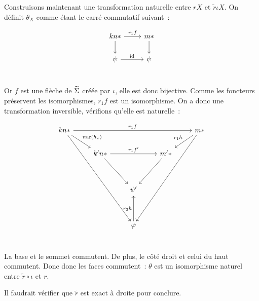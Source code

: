 \begin{pv}
    Construisons maintenant une transformation naturelle entre $rX$ et
    $\tilde{r}\iota X$. On définit $\theta_X$ comme étant le carré commutatif
    suivant~:

    \[\begin{tikzcd}
        kn\ast\arrow[r, "r_1f"]\arrow[d] & m\ast\arrow[d] \\
        \psi\arrow[r, "\id"] & \psi \\
    \end{tikzcd}\]

    Or $f$ est une flèche de $\widetilde{\Sigma}$ créée par $\iota$, elle est donc bijective. Comme
    les foncteurs préservent les isomorphismes, $r_1f$ est un isomorphisme. On a donc
    une transformation inversible, vérifions qu'elle est naturelle~:

    \[\begin{tikzcd}
        kn\ast\arrow[rrrr, "r_1f"]\arrow[dr, "n\arf(h_\star)"]\arrow[dddddrr]
            & & & & m\ast\arrow[dl, swap, "r_1h"]\arrow[dddddll] \\
        & k'n\ast\arrow[rr, "r_1f'"]\arrow[ddr]
            & & m'\ast\arrow[ddl] & \\
        & & & & \\
        & & \psi' & & \\
        & & & & \\
        & & \phi\arrow[uu, "r_2h"] & & \\
    \end{tikzcd}\]

    La base et le sommet commutent. De plus, le côté droit et celui du haut commutent.
    Donc donc les faces commutent~: $\theta$ est un isomorphisme naturel entre
    $\tilde{r}\circ\iota$ et $r$.

    Il faudrait vérifier que $\tilde{r}$ est exact à droite pour conclure.
\end{pv}


